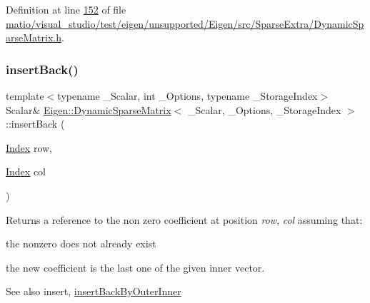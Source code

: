 Definition at line \hyperlink{matio_2visual__studio_2test_2eigen_2unsupported_2_eigen_2src_2_sparse_extra_2_dynamic_sparse_matrix_8h_source_l00152}{152} of file \hyperlink{matio_2visual__studio_2test_2eigen_2unsupported_2_eigen_2src_2_sparse_extra_2_dynamic_sparse_matrix_8h_source}{matio/visual\+\_\+studio/test/eigen/unsupported/\+Eigen/src/\+Sparse\+Extra/\+Dynamic\+Sparse\+Matrix.\+h}.

\mbox{\label{class_eigen_1_1_dynamic_sparse_matrix_a0a556652195b91c09e9f6c4d8b7cc81d}} 
\subsubsection{\texorpdfstring{insert\+Back()}{insertBack()}\hspace{0.1cm}{\footnotesize\ttfamily [2/2]}}
{\footnotesize\ttfamily template$<$typename \+\_\+\+Scalar, int \+\_\+\+Options, typename \+\_\+\+Storage\+Index$>$ \\
Scalar\& \hyperlink{class_eigen_1_1_dynamic_sparse_matrix}{Eigen\+::\+Dynamic\+Sparse\+Matrix}$<$ \+\_\+\+Scalar, \+\_\+\+Options, \+\_\+\+Storage\+Index $>$\+::insert\+Back (\begin{DoxyParamCaption}\item[{\hyperlink{group___core___module_a554f30542cc2316add4b1ea0a492ff02}{Index}}]{row,  }\item[{\hyperlink{group___core___module_a554f30542cc2316add4b1ea0a492ff02}{Index}}]{col }\end{DoxyParamCaption})\hspace{0.3cm}{\ttfamily [inline]}}

\begin{DoxyReturn}{Returns}
a reference to the non zero coefficient at position {\itshape row}, {\itshape col} assuming that\+:
\begin{DoxyItemize}
\item the nonzero does not already exist
\item the new coefficient is the last one of the given inner vector.
\end{DoxyItemize}
\end{DoxyReturn}
\begin{DoxySeeAlso}{See also}
insert, \hyperlink{class_eigen_1_1_dynamic_sparse_matrix_ac97c2463058ae55d7f0ef21c851eb5f3}{insert\+Back\+By\+Outer\+Inner} 
\end{DoxySeeAlso}


